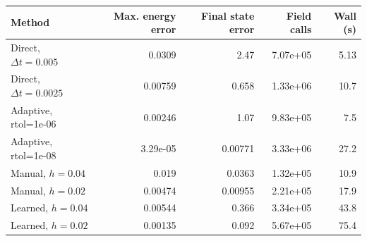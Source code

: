 \begin{tabular}{lrrrr}
\toprule
Method & Max. energy error & Final state error & Field calls & Wall (s) \\
\midrule
Direct, $\Delta t=0.005$ & 0.0309 & 2.47 & 7.07e+05 & 5.13 \\
Direct, $\Delta t=0.0025$ & 0.00759 & 0.658 & 1.33e+06 & 10.7 \\
Adaptive, rtol=1e-06 & 0.00246 & 1.07 & 9.83e+05 & 7.5 \\
Adaptive, rtol=1e-08 & 3.29e-05 & 0.00771 & 3.33e+06 & 27.2 \\
Manual, $h=0.04$ & 0.019 & 0.0363 & 1.32e+05 & 10.9 \\
Manual, $h=0.02$ & 0.00474 & 0.00955 & 2.21e+05 & 17.9 \\
Learned, $h=0.04$ & 0.00544 & 0.366 & 3.34e+05 & 43.8 \\
Learned, $h=0.02$ & 0.00135 & 0.092 & 5.67e+05 & 75.4 \\
\bottomrule
\end{tabular}
